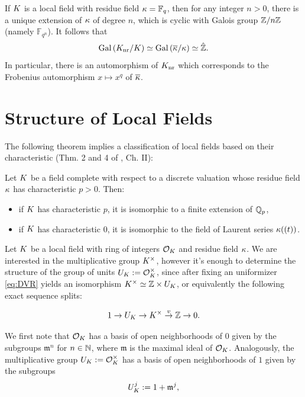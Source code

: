 \documentclass[a4paper, oneside]{memoir}
\begin{document}
\begin{example}\label{ex:FinFields}
    If $K$ is a local field with residue field $\kappa=\mathbb{F}_q$, then for any integer $n>0$, there is a unique extension of $\kappa$ of degree $n$, which is cyclic with Galois group $\mathbb{Z}/n\mathbb{Z}$ (namely $\mathbb{F}_{q^n}$). It follows that
    \[
        \operatorname{Gal}{(K_{\text{nr}}/K)}\simeq \operatorname{Gal}{(\overline{\kappa} / \kappa)}\simeq \hat{\mathbb{Z}}.
    \]
    In particular, there is an automorphism of $K_{\text{nr}}$ which corresponds to the Frobenius automorphism $x\mapsto x^q$ of $\overline{\kappa}$.
\end{example}

\section{Structure of Local Fields}

The following theorem implies a classification of local fields based on their characteristic (Thm. 2 and 4 of \cite{SerreCL}, Ch. II):

\begin{theorem}
    Let $K$ be a field complete with respect to a discrete valuation whose residue field $\kappa$ has characteristic $p>0$. Then:
    \begin{itemize}
        \item if $K$ has characteristic $p$, it is isomorphic to a finite extension of $\mathbb{Q}_p$,
        \item if $K$ has characteristic $0$, it is isomorphic to the field of Laurent series $\kappa((t))$.
    \end{itemize}
\end{theorem}

Let $K$ be a local field with ring of integers $\mathcal{O}_K$ and residue field $\kappa$. We are interested in the multiplicative group $K^\times$, however it's enough to determine the structure of the group of units $U_K:=\mathcal{O}_K^\times$, since after fixing an uniformizer \eqref{eq:DVR} yields an isomorphism $K^\times\simeq \mathbb{Z}\times U_K$, or equivalently the following exact sequence splits:

\begin{equation}\label{eq:SplitSeq}
    1\to U_K \to K^\times\overset{v}{\to}\mathbb{Z}\to 0.
\end{equation}

We first note that $\mathcal{O}_K$ has a basis of open neighborhoods of $0$ given by the subgroups $\mathfrak{m}^n$ for $n\in\mathbb{N}$, where $\mathfrak{m}$ is the maximal ideal of $\mathcal{O}_K$. Analogously, the multiplicative group $U_K:=\mathcal{O}_K^\times$ has a basis of open neighborhoods of $1$ given by the subgroups
\[
    U_K^j:=1+\mathfrak{m}^j,
\]
\end{document}
